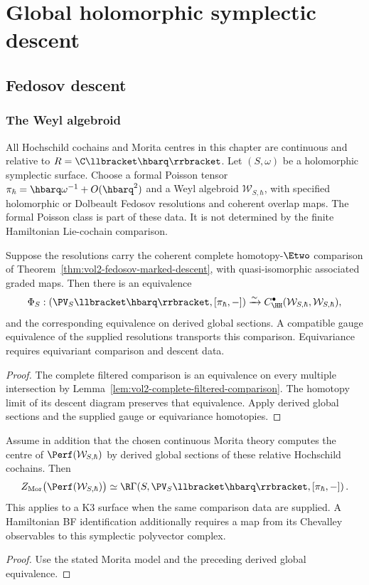 \part{Global holomorphic symplectic descent}

\chapter{Fedosov descent}
\section{The Weyl algebroid}
All Hochschild cochains and Morita centres in this chapter are continuous
and relative to $R=\C\llbracket\hbarq\rrbracket$.
Let $(S,\omega)$ be a holomorphic symplectic surface.
Choose a formal Poisson tensor
$\pi_\hbar=\hbarq\omega^{-1}+O(\hbarq^2)$ and a Weyl algebroid
$\mathcal W_{S,\hbar}$, with specified holomorphic or Dolbeault
Fedosov resolutions and coherent overlap maps.
The formal Poisson class is part of these data.
It is not determined by the finite Hamiltonian Lie-cochain comparison.

\begin{theorem}
Suppose the resolutions carry the coherent complete
homotopy-$\Etwo$ comparison of
Theorem~\ref{thm:vol2-fedosov-marked-descent}, with
quasi-isomorphic associated graded maps. Then there is an equivalence
\[
 \Phi_S:
 \left(\PV_S\llbracket\hbarq\rrbracket,[\pi_\hbar,-]\right)
 \xrightarrow{\sim}
 C^\bullet_{\HH}(\mathcal W_{S,\hbar},\mathcal W_{S,\hbar}),
\]
and the corresponding equivalence on derived global sections.
A compatible gauge equivalence of the supplied resolutions
transports this comparison. Equivariance requires equivariant
comparison and descent data.
\end{theorem}
\begin{proof}
The complete filtered comparison is an equivalence on every
multiple intersection by Lemma~\ref{lem:vol2-complete-filtered-comparison}.
The homotopy limit of its descent diagram preserves that equivalence.
Apply derived global sections and the supplied gauge or equivariance
homotopies.
\end{proof}

\begin{corollary}
Assume in addition that the chosen continuous Morita theory computes
the centre of $\Perf(\mathcal W_{S,\hbar})$ by derived global
sections of these relative Hochschild cochains. Then
\[
 Z_{\mathrm{Mor}}\bigl(\Perf(\mathcal W_{S,\hbar})\bigr)
 \simeq
 \R\Gamma\!
 \left(S,\PV_S\llbracket\hbarq\rrbracket,[\pi_\hbar,-]\right).
\]
This applies to a K3 surface when the same comparison data are supplied.
A Hamiltonian BF identification additionally requires a map from its
Chevalley observables to this symplectic polyvector complex.
\end{corollary}
\begin{proof}
Use the stated Morita model and the preceding derived global equivalence.
\end{proof}

